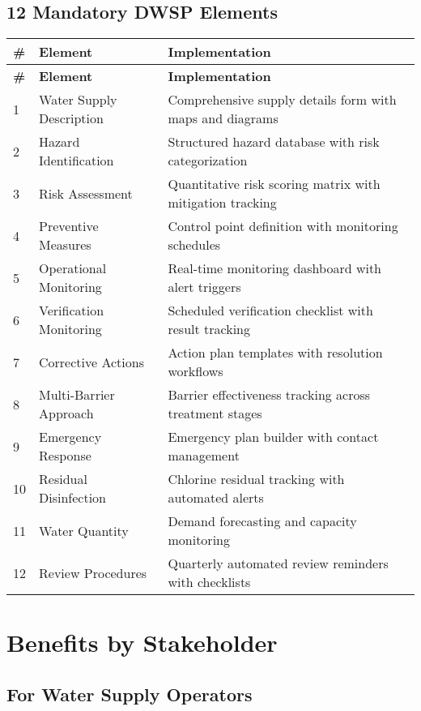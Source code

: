 \documentclass[11pt,a4paper]{article}
\begin{document}
\subsection{12 Mandatory DWSP Elements}

\begin{longtable}{p{1cm}p{4cm}p{8.5cm}}
\toprule
\textbf{\#} & \textbf{Element} & \textbf{Implementation} \\
\midrule
\endfirsthead
\toprule
\textbf{\#} & \textbf{Element} & \textbf{Implementation} \\
\midrule
\endhead
1 & Water Supply Description & Comprehensive supply details form with maps and diagrams \\[0.3cm]
2 & Hazard Identification & Structured hazard database with risk categorization \\[0.3cm]
3 & Risk Assessment & Quantitative risk scoring matrix with mitigation tracking \\[0.3cm]
4 & Preventive Measures & Control point definition with monitoring schedules \\[0.3cm]
5 & Operational Monitoring & Real-time monitoring dashboard with alert triggers \\[0.3cm]
6 & Verification Monitoring & Scheduled verification checklist with result tracking \\[0.3cm]
7 & Corrective Actions & Action plan templates with resolution workflows \\[0.3cm]
8 & Multi-Barrier Approach & Barrier effectiveness tracking across treatment stages \\[0.3cm]
9 & Emergency Response & Emergency plan builder with contact management \\[0.3cm]
10 & Residual Disinfection & Chlorine residual tracking with automated alerts \\[0.3cm]
11 & Water Quantity & Demand forecasting and capacity monitoring \\[0.3cm]
12 & Review Procedures & Quarterly automated review reminders with checklists \\
\bottomrule
\end{longtable}

\newpage

\section{Benefits by Stakeholder}

\subsection{For Water Supply Operators}
\end{document}
